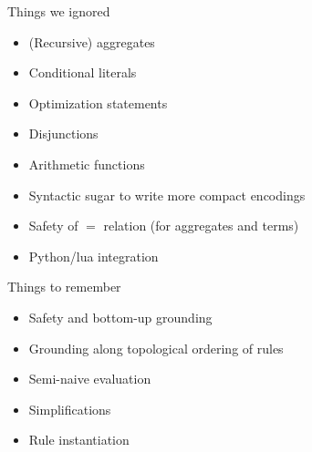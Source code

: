 \begin{frame}{Things we ignored}
  \bigskip
  \begin{itemize}
  \item (Recursive) aggregates
  \item Conditional literals
  \item Optimization statements
  \item Disjunctions
  \item Arithmetic functions
  \item Syntactic sugar to write more compact encodings
  \item Safety of \(=\) relation (for aggregates and terms)
  \item Python/lua integration
  \end{itemize}
\end{frame}
\begin{frame}{Things to remember}
  \bigskip
  \begin{itemize}
  \item Safety and bottom-up grounding
  \item Grounding along topological ordering of rules
  \item Semi-naive evaluation
  \item Simplifications
  \item Rule instantiation
  \end{itemize}
\end{frame}
%
